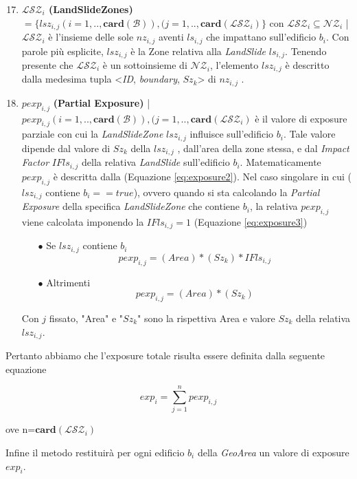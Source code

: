 \begin{enumerate}
	\setcounter{enumi}{16}

	\item \label{LSZ} \textbf{$ \mathcal{LSZ}_i $ (LandSlideZones)} $ = \{lsz_{i,j}(i=1,..,\mathbf{card}(\mathcal{B})),(j=1,..,\mathbf{card}(\mathcal{LSZ}_i)\}$ con $\mathcal{LSZ}_i \subseteq \mathcal{NZ}_i$ | $\mathcal{LSZ}_i$ 
	è l'insieme delle sole $nz_{i,j}$ aventi $ls_{i,j}$ che impattano sull'edificio $b_i$. 
	Con parole più esplicite, $lsz_{i,j}$ è la Zone relativa alla \textit{LandSlide} $ls_{i,j}$. 
	Tenendo presente che $\mathcal{LSZ}_i$ è un sottoinsieme di $\mathcal{NZ}_i$, l'elemento $lsz_{i,j}$  è descritto dalla medesima tupla <\textit{ID}, \textit{boundary}, \textit{$Sz_k$}> di $nz_{i,j}$ . 
	
	\item \label{Pexp} $pexp_{i,j}$ \textbf{(Partial Exposure)} | $ pexp_{i,j}(i=1,..,\mathbf{card}(\mathcal{B})),(j=1,..,\mathbf{card}(\mathcal{LSZ}_i)$ è il valore di exposure parziale con cui la \textit{LandSlideZone} $lsz_{i,j}$ influisce sull'edificio $b_i$. Tale valore dipende dal valore di $Sz_k$ della $lsz_{i,j}$ , dall'area della zone stessa, e dal \textit{Impact Factor} $IFls_{i,j}$ della relativa \textit{LandSlide} sull'edificio $b_i$. Matematicamente $pexp_{i,j}$ è descritta dalla (Equazione \ref{eq:exposure2}). Nel caso singolare in cui ($lsz_{i,j}$ contiene $b_i==true$), ovvero quando si sta calcolando la \textit{Partial Exposure} della specifica \textit{LandSlideZone} che contiene $b_i$, la relativa $pexp_{i,j}$ viene calcolata imponendo la $IFls_{i,j}=1$ (Equazione \ref{eq:exposure3})  
	\\
	\begin{enumerate}
		\item[$\bullet$] Se $lsz_{i,j}$ contiene $b_i$
		\begin{equation}\label{eq:exposure2}
		pexp_{i,j} =(Area)*(Sz_{k}) * IFls_{i,j}
		\end{equation}
		
		\item[$\bullet$] Altrimenti
		\begin{equation}\label{eq:exposure3}
		pexp_{i,j} =(Area)*(Sz_{k})
		\end{equation}
	\end{enumerate}

	{Con $j$ fissato, "Area" e "$Sz_k$" sono la rispettiva Area e valore $Sz_k$ della relativa $lsz_{i,j}$.}
	
\end{enumerate}

Pertanto abbiamo che l'exposure totale risulta essere definita dalla seguente equazione

\begin{equation}\label{eq:exposure1}
exp_i =\sum_{j=1}^n pexp_{i,j}
\end{equation}

ove n=$\mathbf{card}(\mathcal{LSZ}_i)$
\bigbreak

Infine il metodo restituirà per ogni edificio $b_i$ della \textit{GeoArea} un valore di exposure $exp_i$.






